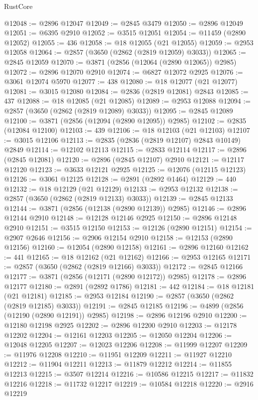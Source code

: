 \begin{lexlean}{RustCore}
\begin{coremodule}
@12048 := @2896 @12047
@12049 := @2845 @3479
@12050 := @2896 @12049
@12051 := @6395 @2910
@12052 := @3515 @12051
@12054 := @11459 (@2890 @12052)
@12055 := 436
@12058 := @18 @12055 (@21 @12055)
@12059 := @2953 @12058
@12064 := @2857 (@3650 (@2862 (@2819 @12059) @3033))
@12065 := @2845 @12059
@12070 := @3871 (@2856 (@12064 (@2890 @12065)) @2985)
@12072 := @2896 @12070 @2910
@12074 := @6827 @12072 @2925
@12076 := @3061 @12074 @5970
@12077 := 438
@12080 := @18 @12077 (@21 @12077)
@12081 := @3015 @12080
@12084 := @2836 (@2819 @12081) @2843
@12085 := 437
@12088 := @18 @12085 (@21 @12085)
@12089 := @2953 @12088
@12094 := @2857 (@3650 (@2862 (@2819 @12089) @3033))
@12095 := @2845 @12089
@12100 := @3871 (@2856 (@12094 (@2890 @12095)) @2985)
@12102 := @2835 (@12084 @12100)
@12103 := 439
@12106 := @18 @12103 (@21 @12103)
@12107 := @3015 @12106
@12113 := @2835 (@2836 (@2819 @12107) @2843 @10149) @2849
@12114 := @12102 @12113
@12115 := @2833 @12114
@12117 := @2896 (@2845 @12081)
@12120 := @2896 (@2845 @12107) @2910
@12121 := @12117 @12120
@12123 := @3633 @12121 @2925
@12125 := @12076 (@12115 @12123)
@12126 := @3061 @12125
@12128 := @2891 (@2892 @1464)
@12129 := 440
@12132 := @18 @12129 (@21 @12129)
@12133 := @2953 @12132
@12138 := @2857 (@3650 (@2862 (@2819 @12133) @3033))
@12139 := @2845 @12133
@12144 := @3871 (@2856 (@12138 (@2890 @12139)) @2985)
@12146 := @2896 @12144 @2910
@12148 := @12128 @12146 @2925
@12150 := @2896 @12148 @2910
@12151 := @3515 @12150
@12153 := @12126 (@2890 @12151)
@12154 := @2907 @2646
@12156 := @2906 @12154 @2910
@12158 := @12153 (@2890 @12156)
@12160 := @12054 (@2890 @12158)
@12161 := @2896 @12160
@12162 := 441
@12165 := @18 @12162 (@21 @12162)
@12166 := @2953 @12165
@12171 := @2857 (@3650 (@2862 (@2819 @12166) @3033))
@12172 := @2845 @12166
@12177 := @3871 (@2856 (@12171 (@2890 @12172)) @2985)
@12178 := @2896 @12177
@12180 := @2891 (@2892 @1786)
@12181 := 442
@12184 := @18 @12181 (@21 @12181)
@12185 := @2953 @12184
@12190 := @2857 (@3650 (@2862 (@2819 @12185) @3033))
@12191 := @2845 @12185
@12196 := @4899 (@2856 (@12190 (@2890 @12191)) @2985)
@12198 := @2896 @12196 @2910
@12200 := @12180 @12198 @2925
@12202 := @2896 @12200 @2910
@12203 := @12178 @12202
@12204 := @12161 @12203
@12205 := @12050 @12204
@12206 := @12048 @12205
@12207 := @12023 @12206
@12208 := @11999 @12207
@12209 := @11976 @12208
@12210 := @11951 @12209
@12211 := @11927 @12210
@12212 := @11904 @12211
@12213 := @11879 @12212
@12214 := @11855 @12213
@12215 := @3507 @12214
@12216 := @10586 @12215
@12217 := @11832 @12216
@12218 := @11732 @12217
@12219 := @10584 @12218
@12220 := @2916 @12219

\end{coremodule}
\end{lexlean}
